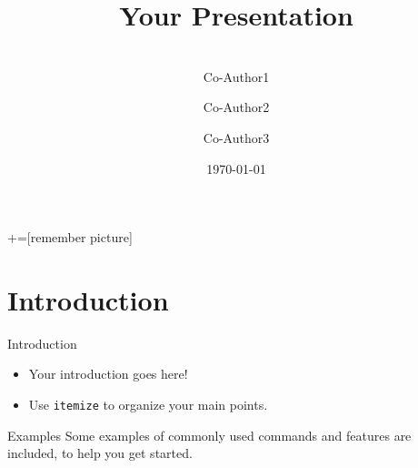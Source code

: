 \documentclass{beamer} %
\title[Your Short Title]{Your Presentation}
\author{\makebox[.9\textwidth]{Lead Author}\\ Co-Author1 \and Co-Author2 \and Co-Author3}
\institute{The Ohio State University \and Another University}
\date{\today}
\begin{document}
\begin{frame}
	\titlepage
\end{frame}

+=[remember picture]

\everymath{\displaystyle}


\section{Introduction}

\begin{frame}{Introduction}
	
	\begin{itemize}
		\item Your introduction goes here!
		\item Use \texttt{itemize} to organize your main points.
	\end{itemize}
	
	\vskip 1cm
	
	\begin{block}{Examples}
		Some examples of commonly used commands and features are included, to help you get started.
	\end{block}
	
\end{frame}
\end{document}
